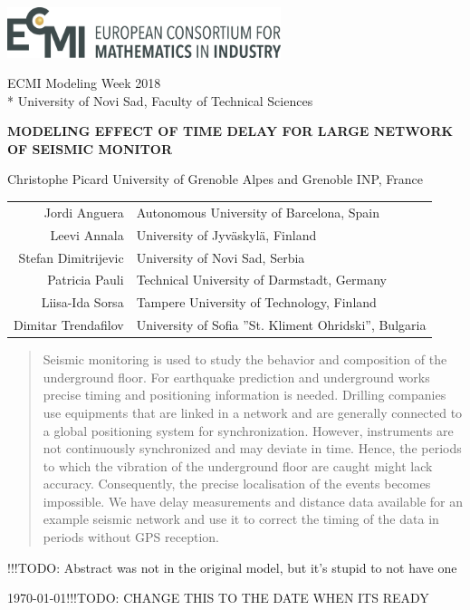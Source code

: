 \documentclass[12pt, sumlimits, intlimits]{article}
\newcommand\todo[1]{{\color{red}!!!TODO: #1}}
\begin{document}
\includegraphics[width=8cm]{../figures/ecmi-logo.png}

ECMI Modeling Week 2018 \\*
University of Novi Sad, Faculty of Technical Sciences

\begin{center}
\vspace{2.0cm}
{\Large{\textbf{\MakeUppercase{Modeling effect of time delay for large network of seismic monitor}}}}


Christophe Picard University of Grenoble Alpes and Grenoble INP, France

\begin{tabular}{rl}
Jordi Anguera & Autonomous University of Barcelona, Spain \\
Leevi Annala & University of Jyväskylä, Finland \\
Stefan Dimitrijevic & University of Novi Sad, Serbia \\
Patricia Pauli & Technical University of Darmstadt, Germany \\
Liisa-Ida Sorsa & Tampere University of Technology, Finland \\ 
Dimitar Trendafilov & University of Sofia ''St. Kliment Ohridski'', Bulgaria

\end{tabular}

\begin{abstract}
	Seismic monitoring is used to study the behavior and composition of the underground floor. For earthquake prediction and underground works precise timing and positioning information is needed. Drilling companies use equipments that are linked in a network and are generally connected to a global positioning system for synchronization. However, instruments are not continuously  synchronized and may deviate in time. Hence, the periods to which the vibration of the underground floor are caught might lack accuracy. Consequently, the precise localisation of the events becomes impossible. We have delay measurements and distance data available for an example seismic network and  use it to correct the timing of the data in periods without GPS reception.
	
\end{abstract}
\todo{Abstract was not in the original model, but it's stupid to not have one}


\today \todo{ CHANGE THIS TO THE DATE WHEN ITS READY}

\end{center}
\end{document}

